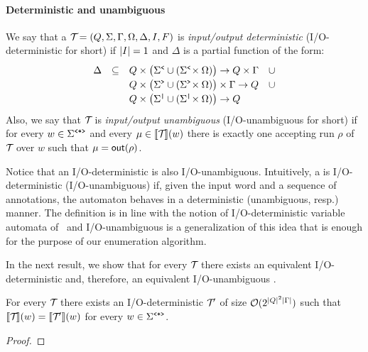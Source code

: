 \paragraph{Deterministic and unambiguous \vpannnames}
We say that a \vpann $\mathcal{T}\! = (Q, \Sigma, \Gamma, \Omega, \Delta, I, F)$ is \emph{input/output deterministic} (I/O-deterministic for short)
 if $|I| = 1$ and $\Delta$ is a partial function of the form:
$$
\renewcommand{\arraystretch}{1.2}
\begin{array}{rcl}
	\Delta & \subseteq & 
	Q \times \big(\opS \cup (\opS \!\times \oalph)\big) \to Q \times \Gamma \ \ \ \cup \\
	& & Q \times \big(\clS  \cup  (\clS \!\times \oalph)\big) \times \Gamma \to Q \ \ \ \cup  \\
	& & Q \times \big(\noS  \cup  (\noS \!\times \oalph)\big) \to Q
\end{array}
$$
Also, we say that $\mathcal{T}\!$ is \emph{input/output unambiguous} (I/O-unambiguous for short) if for every $w\in \Sigma^{\texttt{<*>}}$ and every $\mu \in {\llbracket{\mathcal{T}\!}\rrbracket}(w)$ there is exactly one accepting run $\rho$ of $\mathcal{T}\!$ over $w$ such that $\mu = \textsf{out}(\rho)$. 

Notice that an I/O-deterministic \vpann is also I/O-unambiguous. 
Intuitively, a \vpann is I/O-deterministic (I/O-unambiguous) if, given the input word and a sequence of annotations, the automaton behaves in a deterministic (unambiguous, resp.) manner. 
The definition is in line with the notion of I/O-deterministic variable automata of~\cite{FlorenzanoRUVV20} and I/O-unambiguous is a generalization of this idea that is enough for the purpose of our enumeration algorithm. 

In the next result, we show that for every \vpann $\mathcal{T}\!$ there exists an equivalent I/O-deterministic \vpann and, therefore, an equivalent I/O-unambiguous \vpann. 

\begin{proposition} \label{nested:vpawo:det}
	For every \vpann $\mathcal{T}\!$ there exists an I/O-deterministic \vpann $\mathcal{T}\!'$ of size $\mathcal{O}(2^{|Q|^2|\Gamma|})$ such that $\llbracket \mathcal{T}\! \rrbracket(w) = \llbracket \mathcal{T}\!' \rrbracket(w)$ for every $w\in\Sigma^{\texttt{<*>}}$.
\end{proposition}
\begin{proof}
	
\end{proof}

